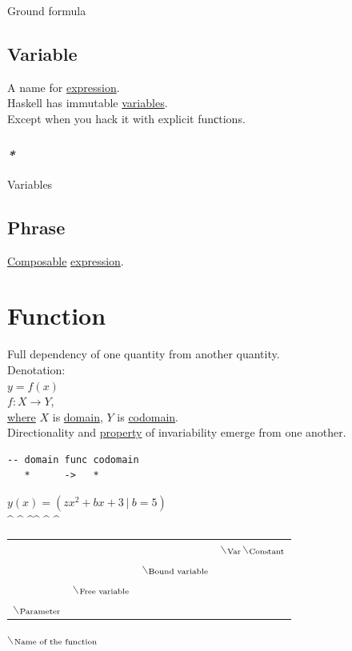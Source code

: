 \documentclass[a4paper,14pt,oneside]{book}
\begin{document}
\label{org7645b59}Ground formula\\

\section{\label{orgbfc0143}Variable}
\label{sec:org03d9ae5}
A name for \hyperref[org70841e3]{expression}.\\

Haskell has immutable \hyperref[org4277fa3]{variables}.\\
Except when you hack it with explicit funсtions.\\

\subsection{\emph{*}}
\label{sec:org68cd0b5}

\label{org4277fa3}Variables\\

\section{\label{org9116219}Phrase}
\label{sec:org723e869}
\hyperref[orgce469e7]{Composable} \hyperref[org70841e3]{expression}.\\

\chapter{\label{orgad0a745}Function}
\label{sec:org89cdd95}
Full dependency of one quantity from another quantity.\\

Denotation:\\
\(y = f(x)\)\\
\(f: X \to Y\),\\
\hyperref[org95b6103]{where} \(X\) is \hyperref[org7abf7a8]{domain}, \(Y\) is \hyperref[org5aa02f9]{codomain}.\\

Directionality and \hyperref[orgd3f5c46]{property} of invariability emerge from one another.\\
\begin{verbatim}
-- domain func codomain
   *      ->   *
\end{verbatim}

\(y(x) = (zx^{2} + bx + 3 \ | \ b = 5)\)\\
\^{} \^{}    \^{}\^{}    \^{}   \^{}\\
\begin{center}
\begin{tabular}{llll}
 &  &  & $\backslash$\(\textsubscript{Var}\)$\backslash$\(\textsubscript{Constant}\)\\
 &  & $\backslash$\(\textsubscript{Bound variable}\)\\
 & $\backslash$\(\textsubscript{Free variable}\)\\
$\backslash$\(\textsubscript{Parameter}\)\\
\end{tabular}
\end{center}
$\backslash$\(\textsubscript{Name of the function}\)\\
\end{document}
